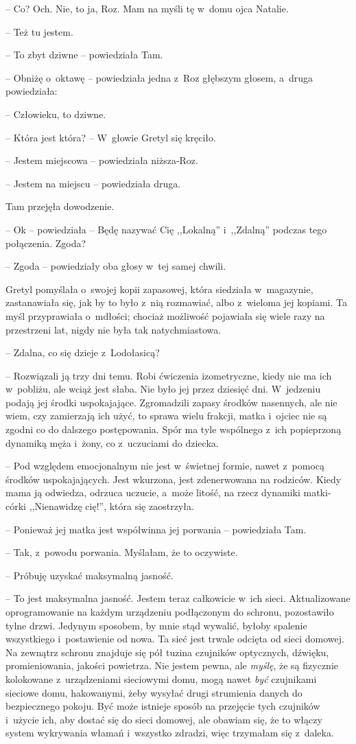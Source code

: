 \documentclass[oneside,polish,11pt,sfheadings]{mwbk}
\begin{document}
-- Co? Och. Nie, to ja, Roz. Mam na myśli tę w~domu ojca Natalie.

-- Też tu jestem.

-- To zbyt dziwne -- powiedziała Tam.

-- Obniżę o~oktawę -- powiedziała jedna z~Roz głębszym głosem, a~druga
powiedziała: 

-- Człowieku, to dziwne.

-- Która jest która? -- W~głowie Gretyl się kręciło.

-- Jestem miejscowa -- powiedziała niższa-Roz.

-- Jestem na miejscu -- powiedziała druga.

Tam przejęła dowodzenie. 

-- Ok -- powiedziała -- Będę nazywać Cię
,,Lokalną'' i~,,Zdalną'' podczas tego połączenia. Zgoda?

-- Zgoda -- powiedziały oba głosy w~tej samej chwili. 

Gretyl pomyślała o~swojej kopii zapasowej, która siedziała w~magazynie, zastanawiała się,
jak by to było z~nią rozmawiać, albo z~wieloma jej kopiami. Ta myśl
przyprawiała o~mdłości; chociaż możliwość pojawiała się wiele razy na
przestrzeni lat, nigdy nie była tak natychmiastowa.

-- Zdalna, co się dzieje z~Lodołasicą?

-- Rozwiązali ją trzy dni temu. Robi ćwiczenia izometryczne, kiedy nie ma
ich w~pobliżu, ale wciąż jest słaba. Nie było jej przez dziesięć dni. W~jedzeniu podają jej środki uspokajające. Zgromadzili zapasy środków
nasennych, ale nie wiem, czy zamierzają ich użyć, to sprawa wielu
frakcji, matka i~ojciec nie są zgodni co do dalszego postępowania. Spór
ma tyle wspólnego z~ich popieprzoną dynamiką męża i~żony, co z~uczuciami
do dziecka.

-- Pod względem emocjonalnym nie jest w~świetnej formie, nawet z~pomocą
środków uspokajających. Jest wkurzona, jest zdenerwowana na rodziców.
Kiedy mama ją odwiedza, odrzuca uczucie, a~może litość, na rzecz
dynamiki matki-córki ,,Nienawidzę cię!'', która się zaostrzyła.

-- Ponieważ jej matka jest współwinna jej porwania -- powiedziała Tam.

-- Tak, z~powodu porwania. Myślałam, że to oczywiste.

-- Próbuję uzyskać maksymalną jasność.

-- To jest maksymalna jasność. Jestem teraz całkowicie w~ich sieci.
Aktualizowane oprogramowanie na każdym urządzeniu podłączonym do
schronu, pozostawiło tylne drzwi. Jedynym sposobem, by mnie stąd
wywalić, byłoby spalenie wszystkiego i~postawienie od nowa. Ta sieć jest
trwale odcięta od sieci domowej. Na zewnątrz schronu znajduje się pół
tuzina czujników optycznych, dźwięku, promieniowania, jakości powietrza.
Nie jestem pewna, ale \textit{myślę}, że są fizycznie kolokowane z~urządzeniami sieciowymi domu, mogą nawet \textit{być }czujnikami sieciowe
domu, hakowanymi, żeby wysyłać drugi strumienia danych do bezpiecznego
pokoju. Być może istnieje sposób na przejęcie tych czujników i~użycie
ich, aby dostać się do sieci domowej, ale obawiam się, że to włączy
system wykrywania włamań i~wszystko zdradzi, więc trzymałam się z~daleka.
\end{document}
